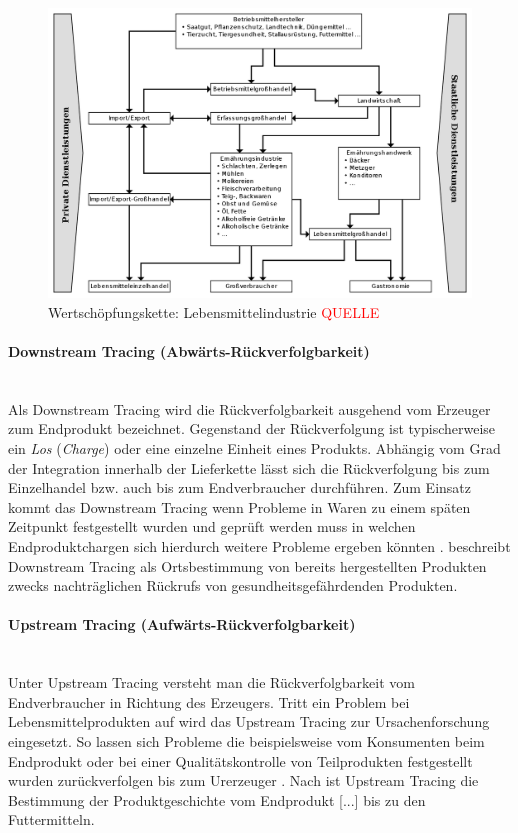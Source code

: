 \begin{figure}[h!]
	\centering
	\includegraphics[width=1.0\linewidth]{pictures/system-of-agribusiness}
	\caption[Wertschöpfungskette: Lebensmittelindustrie]{Wertschöpfungskette: Lebensmittelindustrie \textcolor{red}{QUELLE}}
	\label{fig:wkd-Lebensmittelindustrie}
\end{figure}

\paragraph{Downstream Tracing (Abwärts-Rückverfolgbarkeit)}$~~$\\
Als Downstream Tracing wird die Rückverfolgbarkeit ausgehend vom Erzeuger zum Endprodukt bezeichnet. Gegenstand der Rückverfolgung ist typischerweise ein \textit{Los} (\textit{Charge}) oder eine einzelne Einheit eines Produkts. Abhängig vom Grad der Integration innerhalb der Lieferkette lässt sich die Rückverfolgung bis zum Einzelhandel bzw. auch bis zum Endverbraucher durchführen. Zum Einsatz kommt das Downstream Tracing wenn Probleme in Waren zu einem späten Zeitpunkt festgestellt wurden und geprüft werden muss in welchen Endproduktchargen sich hierdurch weitere Probleme ergeben könnten \citep{Trienekens2001, Zailani2010}. \citet{Wegner-Hambloch2004} beschreibt Downstream Tracing als \glqq Ortsbestimmung von bereits hergestellten Produkten zwecks nachträglichen Rückrufs von gesundheitsgefährdenden Produkten\grqq{}.

\paragraph{Upstream Tracing (Aufwärts-Rückverfolgbarkeit)}$~~$\\
Unter Upstream Tracing versteht man die Rückverfolgbarkeit vom Endverbraucher in Richtung des Erzeugers. Tritt ein Problem bei Lebensmittelprodukten auf wird das Upstream Tracing zur Ursachenforschung eingesetzt. So lassen sich Probleme die beispielsweise vom Konsumenten beim Endprodukt oder bei einer Qualitätskontrolle von Teilprodukten festgestellt wurden zurückverfolgen bis zum Urerzeuger \citep{Trienekens2001, Zailani2010}. Nach \citet{Wegner-Hambloch2004} ist Upstream Tracing \glqq die Bestimmung der Produktgeschichte vom Endprodukt [...] bis zu den Futtermitteln.\grqq{}

